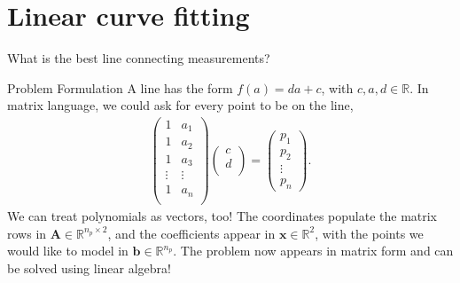 \documentclass[notes=only]{beamer}
\begin{document}
  \section{Linear curve fitting}
    \begin{frame}{What is the best line connecting measurements?}
      \begin{figure}
      \centering
      
      \end{figure}
    \end{frame}

    \begin{frame}{Problem Formulation}
      A line has the form $f(a) = da + c$, with $c,a,d \in \mathbb{R}$. In matrix language, we could ask for every point to be on the line,
      \begin{align}
        \begin{pmatrix}
          1 & a_1 \\ 
          1 & a_2 \\
          1 & a_3 \\
          \vdots  & \vdots \\ 
          1 & a_n \\
        \end{pmatrix}
        \begin{pmatrix}
          c \\ d \\
        \end{pmatrix}
        = 
        \begin{pmatrix}
          p_1 \\
          p_2 \\
          \vdots \\ 
          p_n  
        \end{pmatrix}.
      \end{align}
      We can treat polynomials as vectors, too! The coordinates populate the matrix rows in $\mathbf{A} \in \mathbb{R}^{n_p \times 2}$, and the coefficients
      appear in $\mathbf{x} \in \mathbb{R}^{2}$, with the points we would like to model in $\mathbf{b} \in \mathbb{R}^{n_p}$.
      The problem now appears in matrix form and can be solved using linear algebra!
    \end{frame}
\end{document}
